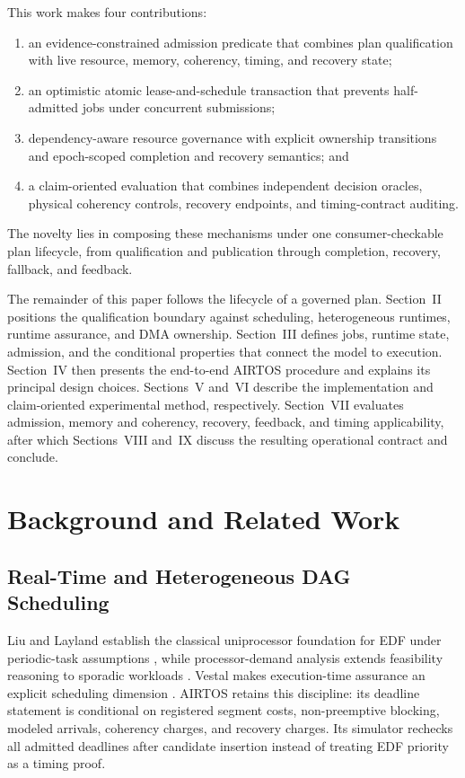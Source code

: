 \documentclass[lettersize,journal]{IEEEtran}
\begin{document}
This work makes four contributions:
\begin{enumerate}
  \item an evidence-constrained admission predicate that combines plan
  qualification with live resource, memory, coherency, timing, and recovery
  state;
  \item an optimistic atomic lease-and-schedule transaction that prevents
  half-admitted jobs under concurrent submissions;
  \item dependency-aware resource governance with explicit ownership
  transitions and epoch-scoped completion and recovery semantics; and
  \item a claim-oriented evaluation that combines independent decision
  oracles, physical coherency controls, recovery endpoints, and timing-contract
  auditing.
\end{enumerate}
The novelty lies in composing these mechanisms under one consumer-checkable
plan lifecycle, from qualification and publication through completion,
recovery, fallback, and feedback.

The remainder of this paper follows the lifecycle of a governed plan.
Section~II positions the qualification boundary against scheduling,
heterogeneous runtimes, runtime assurance, and DMA ownership. Section~III
defines jobs, runtime state, admission, and the conditional properties that
connect the model to execution. Section~IV then presents the end-to-end AIRTOS
procedure and explains its principal design choices. Sections~V and~VI describe
the implementation and claim-oriented experimental method, respectively.
Section~VII evaluates admission, memory and coherency, recovery, feedback, and
timing applicability, after which Sections~VIII and~IX discuss the resulting
operational contract and conclude.

\section{Background and Related Work}
\subsection{Real-Time and Heterogeneous DAG Scheduling}
Liu and Layland establish the classical uniprocessor foundation for EDF under
periodic-task assumptions \cite{liu1973scheduling}, while processor-demand
analysis extends feasibility reasoning to sporadic workloads
\cite{baruah1990preemptively}. Vestal makes execution-time assurance an
explicit scheduling dimension \cite{vestal2007preemptive}. AIRTOS retains this
discipline: its deadline statement is conditional on registered segment costs,
non-preemptive blocking, modeled arrivals, coherency charges, and recovery
charges. Its simulator rechecks all admitted deadlines after candidate
insertion instead of treating EDF priority as a timing proof.
\end{document}
